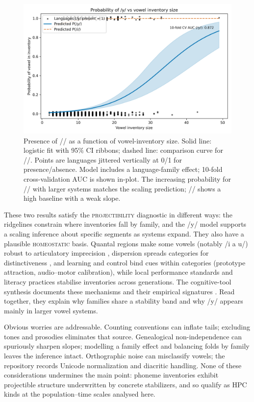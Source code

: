 \documentclass[12pt]{article}
\begin{document}
\begin{figure}[t]
  \centering
  \includegraphics[width=\linewidth]{images/y_vs_vowel_inventory.png}
  \caption{Presence of // as a function of vowel-inventory size.
  Solid line: logistic fit with 95\% CI ribbons; dashed line: comparison curve for //.
  Points are languages jittered vertically at 0/1 for presence/absence.
  Model includes a language-family effect; 10-fold cross-validation AUC is shown in-plot.
  The increasing probability for // with larger systems matches the scaling prediction; // shows a high baseline with a weak slope.}
  \label{fig:y-scaling}
\end{figure}

These two results satisfy the \textsc{projectibility} diagnostic in different ways: the ridgelines constrain where inventories fall by family, and the /y/ model supports a scaling inference about specific segments as systems expand. They also have a plausible \textsc{homeostatic} basis. Quantal regions make some vowels (notably /i a u/) robust to articulatory imprecision \citep{Stevens1989Quantal}, dispersion spreads categories for distinctiveness \citep{LiljencrantsLindblom1972,Lindblom1990HandH}, and learning and control bind cues within categories (prototype attraction, audio–motor calibration), while local performance standards and literacy practices stabilise inventories across generations. The cognitive-tool synthesis documents these mechanisms and their empirical signatures \citep[Fig.\,1; Fig.\,2; Table~1]{Ekstrom2025PhonemeTool}. Read together, they explain why families share a stability band and why /y/ appears mainly in larger vowel systems.

Obvious worries are addressable. Counting conventions can inflate tails; excluding tones and prosodies eliminates that source. Genealogical non-independence can spuriously sharpen slopes; modelling a family effect and balancing folds by family leaves the inference intact. Orthographic noise can misclassify vowels; the repository records Unicode normalization and diacritic handling. None of these considerations undermines the main point: phoneme inventories exhibit projectible structure underwritten by concrete stabilizers, and so qualify as \textsc{HPC} kinds at the population–time scales analysed here.



\clearpage


\end{document}
